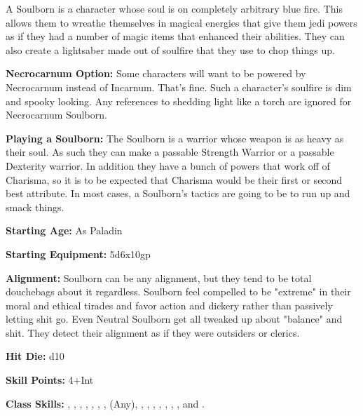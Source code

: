 
A Soulborn is a character whose soul is on completely arbitrary blue fire. This allows them to wreathe themselves in magical energies that give them jedi powers as if they had a number of magic items that enhanced their abilities. They can also create a lightsaber made out of soulfire that they use to chop things up. 

\textbf{Necrocarnum Option:} Some characters will want to be powered by Necrocarnum instead of Incarnum. That's fine. Such a character's soulfire is dim and spooky looking. Any references to shedding light like a torch are ignored for Necrocarnum Soulborn. 

\textbf{Playing a Soulborn:} The Soulborn is a warrior whose weapon is as heavy as their soul. As such they can make a passable Strength Warrior or a passable Dexterity warrior. In addition they have a bunch of powers that work off of Charisma, so it is to be expected that Charisma would be their first or second best attribute. In most cases, a Soulborn's tactics are going to be to run up and smack things. 

\textbf{Starting Age:} As Paladin 

\textbf{Starting Equipment:} 5d6x10gp 

\textbf{Alignment:} Soulborn can be any alignment, but they tend to be total douchebags about it regardless. Soulborn feel compelled to be "extreme" in their moral and ethical tirades and favor action and dickery rather than passively letting shit go. Even Neutral Soulborn get all tweaked up about "balance" and shit. They detect their alignment as if they were outsiders or clerics. 

\textbf{Hit Die:} d10 

\goodbab{}

\goodfor{}
\poorref{}
\goodwil{}

\textbf{Skill Points:} 4+Int 

\textbf{Class Skills:} , , , , , , ,  (Any), , , , , , , , and .

